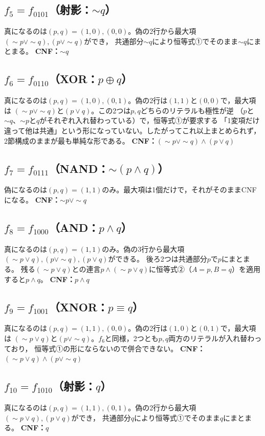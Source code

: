 \documentclass[autodetect-engine,dvi=dvipdfmx,ja=standard]{bxjsarticle}
\begin{document}
\subsection*{\(f_5=f_{0101}\)（射影：\(\sim q\)）}
真になるのは\((p,q)=(1,0),(0,0)\)。偽の2行から最大項\((\sim p\lor\sim q),(p\lor\sim q)\)ができ，
共通部分\(\sim q\)により恒等式①でそのまま\(\sim q\)にまとまる。
\textbf{CNF：}\(\sim q\)

\subsection*{\(f_6=f_{0110}\)（XOR：\(p\oplus q\)）}
真になるのは\((p,q)=(1,0),(0,1)\)。偽の2行は\((1,1)\)と\((0,0)\)で，最大項は
\((\sim p\lor\sim q)\)と\((p\lor q)\)。この2つは\(p,q\)どちらのリテラルも極性が逆
（\(p\)と\(\sim q\)、\(\sim p\)と\(q\)がそれぞれ入れ替わっている）で，恒等式①が要求する
「1変項だけ違って他は共通」という形になっていない。したがってこれ以上まとめられず，
2節構成のままが最も単純な形である。
\textbf{CNF：}\((\sim p\lor\sim q)\land(p\lor q)\)

\subsection*{\(f_7=f_{0111}\)（NAND：\(\sim(p\land q)\)）}
偽になるのは\((p,q)=(1,1)\)のみ。最大項は1個だけで，それがそのままCNFになる。
\textbf{CNF：}\(\sim p\lor\sim q\)

\subsection*{\(f_8=f_{1000}\)（AND：\(p\land q\)）}
真になるのは\((p,q)=(1,1)\)のみ。偽の3行から最大項
\((\sim p\lor q),(p\lor\sim q),(p\lor q)\)ができる。
後ろ2つは共通部分\(p\)で\(p\)にまとまる。
残る\((\sim p\lor q)\)との連言\(p\land(\sim p\lor q)\)に恒等式②（\(A=p,B=q\)）を適用すると\(p\land q\)。
\textbf{CNF：}\(p\land q\)

\subsection*{\(f_9=f_{1001}\)（XNOR：\(p\equiv q\)）}
真になるのは\((p,q)=(1,1),(0,0)\)。偽の2行は\((1,0)\)と\((0,1)\)で，最大項は
\((\sim p\lor q)\)と\((p\lor\sim q)\)。\(f_6\)と同様，2つとも\(p,q\)両方のリテラルが入れ替わっており，
恒等式①の形にならないので併合できない。
\textbf{CNF：}\((\sim p\lor q)\land(p\lor\sim q)\)

\subsection*{\(f_{10}=f_{1010}\)（射影：\(q\)）}
真になるのは\((p,q)=(1,1),(0,1)\)。偽の2行から最大項\((\sim p\lor q),(p\lor q)\)ができ，
共通部分\(q\)により恒等式①でそのまま\(q\)にまとまる。
\textbf{CNF：}\(q\)
\end{document}
